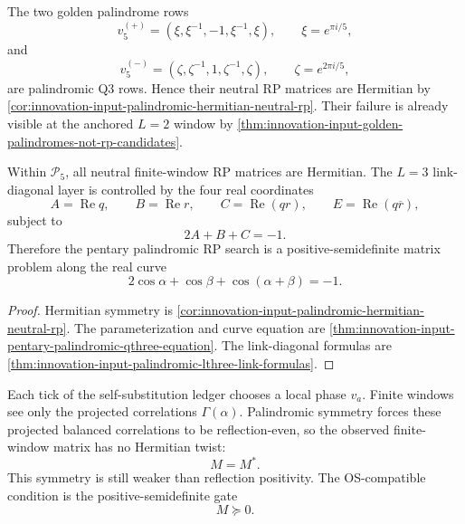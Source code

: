 \begin{example}
\label{ex:innovation-input-golden-palindrome-endpoints-palindromic-reduction}
The two golden palindrome rows
$$
v_5^{(+)}=(\xi,\xi^{-1},-1,\xi^{-1},\xi),
\qquad
\xi=e^{\pi i/5},
$$
and
$$
v_5^{(-)}=(\zeta,\zeta^{-1},1,\zeta^{-1},\zeta),
\qquad
\zeta=e^{2\pi i/5},
$$
are palindromic Q3 rows. Hence their neutral RP matrices are Hermitian by
\autoref{cor:innovation-input-palindromic-hermitian-neutral-rp}. Their
failure is already visible at the anchored $L=2$ window by
\autoref{thm:innovation-input-golden-palindromes-not-rp-candidates}.
\end{example}

\begin{theorem}
\label{thm:innovation-input-pentary-palindromic-search-reduction}
Within $\mathcal P_5$, all neutral finite-window RP matrices are
Hermitian. The $L=3$ link-diagonal layer is controlled by the four real
coordinates
$$
A=\operatorname{Re}q,
\qquad
B=\operatorname{Re}r,
\qquad
C=\operatorname{Re}(qr),
\qquad
E=\operatorname{Re}(q\overline r),
$$
subject to
$$
2A+B+C=-1.
$$
Therefore the pentary palindromic RP search is a positive-semidefinite
matrix problem along the real curve
$$
2\cos\alpha+\cos\beta+\cos(\alpha+\beta)=-1.
$$
\end{theorem}

\begin{proof}
Hermitian symmetry is
\autoref{cor:innovation-input-palindromic-hermitian-neutral-rp}. The
parameterization and curve equation are
\autoref{thm:innovation-input-pentary-palindromic-qthree-equation}. The
link-diagonal formulas are
\autoref{thm:innovation-input-palindromic-lthree-link-formulas}.
\end{proof}

\begin{principle}
\label{prin:innovation-input-palindromic-projection-reading}
Each tick of the self-substitution ledger chooses a local phase $v_a$.
Finite windows see only the projected correlations $\Gamma(\alpha)$.
Palindromic symmetry forces these projected balanced correlations to be
reflection-even, so the observed finite-window matrix has no Hermitian
twist:
$$
M=M^*.
$$
This symmetry is still weaker than reflection positivity. The OS-compatible
condition is the positive-semidefinite gate
$$
M\succeq0.
$$
\end{principle}

